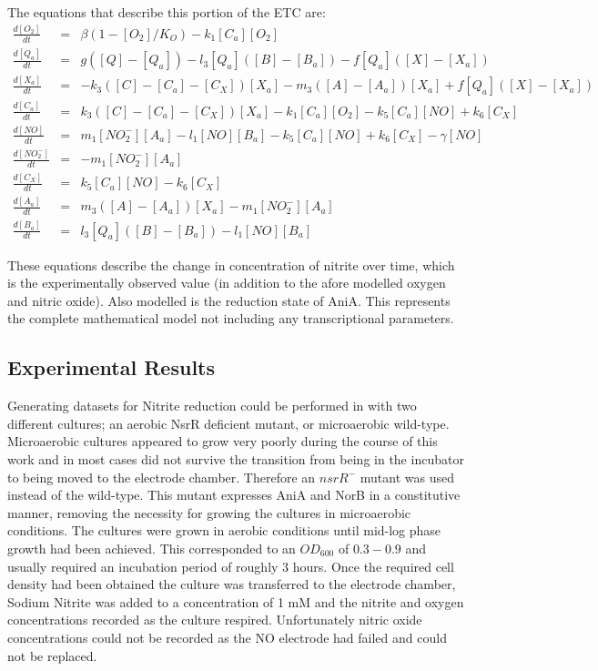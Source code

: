 \noindent The equations that describe this portion of the ETC are:
\begin{eqnarray*}
\frac{d[O_2]}{dt} & = & \beta(1-[O_2]/K_O) - k_{1}[C_a][O_2]\\
\frac{d[Q_a]}{dt} & = & g([Q] - [Q_a]) - l_3[Q_a]([B] - [B_a]) - f[Q_a]([X]-[X_a])\\
\frac{d[X_a]}{dt} & = & -k_3([C] - [C_a] - [C_X])[X_a]  - m_3([A] - [A_a])[X_a] + f[Q_a]([X]-[X_a])\\
\frac{d[C_a]}{dt} & = & k_3([C] - [C_a] - [C_X])[X_a] - k_{1}[C_a][O_2] - k_5[C_a][NO] + k_6[C_X]\\
\frac{d[NO]}{dt} & = & m_{1}[NO_2^-][A_a] - l_1[NO][B_a] - k_5[C_a][NO] + k_6 [C_X] - \gamma[NO]\\
\frac{d[NO_2^-]}{dt} & = & - m_{1}[NO_2^-][A_a]\\
\frac{d[C_X]}{dt} & = & k_5[C_a][NO] - k_6 [C_X]\\
\frac{d[A_a]}{dt} & = & m_3([A] - [A_a])[X_a]- m_{1}[NO_2^-][A_a]\\
\frac{d[B_a]}{dt} & = & l_3[Q_a]([B] - [B_a]) - l_1[NO][B_a]
\end{eqnarray*}

These equations describe the change in concentration of nitrite over time, which is the experimentally observed value (in addition to the afore modelled oxygen and nitric oxide). Also modelled is the reduction state of AniA. This represents the complete mathematical model not including any transcriptional parameters.

\subsection{Experimental Results}
Generating datasets for Nitrite reduction could be performed in with two different cultures; an aerobic NsrR deficient mutant, or microaerobic wild-type. Microaerobic cultures appeared to grow very poorly during the course of this work and in most cases did not survive the transition from being in the incubator to being moved to the electrode chamber. Therefore an $nsrR^-$ mutant was used instead of the wild-type. This mutant expresses AniA and NorB in a constitutive manner, removing the necessity for growing the cultures in microaerobic conditions. The cultures were grown in aerobic conditions until mid-log phase growth had been achieved. This corresponded to an $OD_{600}$ of $0.3-0.9$ and usually required an incubation period of roughly 3 hours. Once the required cell density had been obtained the culture was transferred to the electrode chamber, Sodium Nitrite was added to a concentration of 1 mM and the nitrite and oxygen concentrations recorded as the culture respired. Unfortunately nitric oxide 
concentrations could not be recorded as the NO electrode had failed and could not be replaced.

